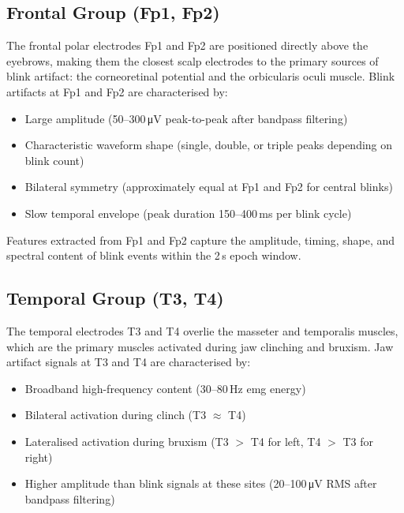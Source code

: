 \subsection{Frontal Group (Fp1, Fp2)}

The frontal polar electrodes Fp1 and Fp2 are positioned
directly above the eyebrows, making them the closest scalp
electrodes to the primary sources of blink artifact: the
corneoretinal potential and the orbicularis oculi muscle.
Blink artifacts at Fp1 and Fp2 are characterised by:

\begin{itemize}[leftmargin=*]
    \item Large amplitude (50--300\,\si{\micro\volt}
    peak-to-peak after bandpass filtering)
    \item Characteristic waveform shape (single, double, or
    triple peaks depending on blink count)
    \item Bilateral symmetry (approximately equal at Fp1
    and Fp2 for central blinks)
    \item Slow temporal envelope (peak duration 150--400\,ms
    per blink cycle)
\end{itemize}

Features extracted from Fp1 and Fp2 capture the amplitude,
timing, shape, and spectral content of blink events within
the 2\,s epoch window.

\subsection{Temporal Group (T3, T4)}

The temporal electrodes T3 and T4 overlie the masseter and
temporalis muscles, which are the primary muscles activated
during jaw clinching and bruxism. Jaw artifact signals at
T3 and T4 are characterised by:

\begin{itemize}[leftmargin=*]
    \item Broadband high-frequency content
    (30--80\,Hz \acrshort{emg} energy)
    \item Bilateral activation during clinch (T3
    $\approx$ T4)
    \item Lateralised activation during bruxism
    (T3 $>$ T4 for left, T4 $>$ T3 for right)
    \item Higher amplitude than blink signals
    at these sites (20--100\,\si{\micro\volt} RMS
    after bandpass filtering)
\end{itemize}

